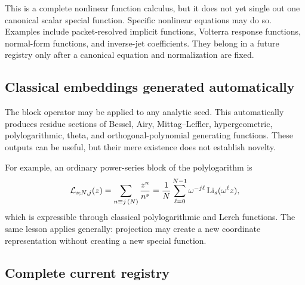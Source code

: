 This is a complete nonlinear function calculus, but it does not yet single out one canonical scalar special function.  Specific nonlinear equations may do so.  Examples include packet-resolved implicit functions, Volterra response functions, normal-form functions, and inverse-jet coefficients.  They belong in a future registry only after a canonical equation and normalization are fixed.

\subsection{Classical embeddings generated automatically}

The block operator may be applied to any analytic seed.  This automatically produces residue sections of Bessel, Airy, Mittag--Leffler, hypergeometric, polylogarithmic, theta, and orthogonal-polynomial generating functions.  These outputs can be useful, but their mere existence does not establish novelty.

For example, an ordinary power-series block of the polylogarithm is
\[
\mathcal L_{s;N,j}(z)
=\sum_{n\equiv j\, (N)}\frac{z^n}{n^s}
=\frac1N\sum_{\ell=0}^{N-1}\omega^{-j\ell}\operatorname{Li}_s(\omega^\ell z),
\]
which is expressible through classical polylogarithmic and Lerch functions.  The same lesson applies generally: projection may create a new coordinate representation without creating a new special function.

\subsection{Complete current registry}


